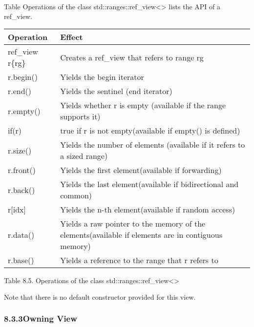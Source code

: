 Table Operations of the class std::ranges::ref\_view<> lists the API of a ref\_view.

\begin{longtable}[c]{|l|l|}
	\hline
	\textbf{Operation} & \textbf{Effect}                                                \\ \hline
	\endfirsthead
	\endhead
	ref\_view r\{rg\}  & Creates a ref\_view that refers to range rg                    \\ \hline
	r.begin()          & Yields the begin iterator                                      \\ \hline
	r.end()            & Yields the sentinel (end iterator)                             \\ \hline
	r.empty()          & Yields whether r is empty (available if the range supports it) \\ \hline
	if(r)              & true if r is not empty(available if empty() is defined)        \\ \hline
	r.size() & Yields the number of elements (available if it refers to a sized range)                            \\ \hline
	r.front()          & Yields the first element(available if forwarding)              \\ \hline
	r.back()           & Yields the last element(available if bidirectional and common) \\ \hline
	r{[}idx{]}         & Yields the n-th element(available if random access)            \\ \hline
	r.data() & Yields a raw pointer to the memory of the elements(available if elements are in contiguous memory) \\ \hline
	r.base()           & Yields a reference to the range that r refers to               \\ \hline
\end{longtable}

\begin{center}
Table 8.5. Operations of the class std::ranges::ref\_view<>
\end{center}

Note that there is no default constructor provided for this view.

\subsubsection*{ 8.3.3\hspace{0.2cm}Owning View}

